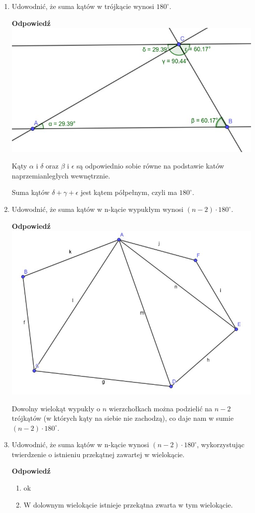 \documentclass[12pt,a4paper]{article}
\newcounter{twierdzenie}
\theoremstyle{break}
\newcommand{\Odp}[1]{
		\begin{mdframed}[style=zadanie]
			\textbf{Odpowiedź}\\
			#1
		\end{mdframed}
	}
\begin{document}
\begin{enumerate}[1.]
	\item Udowodnić, że suma kątów w trójkącie wynosi $180^\circ$.
	\Odp{
		\includegraphics[width=\linewidth]{tr180.jpeg}
		
		Kąty $\alpha$ i $\delta$ oraz $\beta$ i $\epsilon$ są odpowiednio sobie równe na podstawie katów naprzemianległych wewnętrznie.
		
		Suma kątów $\delta + \gamma + \epsilon$ jest kątem półpełnym, czyli ma $180^\circ$.
	}
	
	\item Udowodnić, że suma kątów w n-kącie wypukłym wynosi $(n - 2) \cdot 180^\circ$.
	\Odp{
		\includegraphics[width=\linewidth]{wielo180.jpeg}
		
		Dowolny wielokąt wypukły o $n$ wierzchołkach można podzielić na $n-2$ trójkątów (w których kąty na siebie nie zachodzą), co daje nam w sumie $(n-2)\cdot 180^\circ$.
	}
	
	\item Udowodnić, że suma kątów w n-kącie wynosi $(n - 2) \cdot 180^\circ$, wykorzystując twierdzenie o istnieniu przekątnej zawartej w wielokącie.
	\Odp{
		\begin{enumerate}[I]
			\item ok
			\item W dolownym wielokącie istnieje przekątna zwarta w tym wielokącie.
			

\end{enumerate}}
\end{enumerate}
\end{document}
